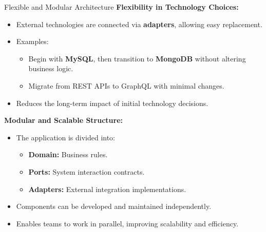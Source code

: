 \documentclass[aspectratio=169, table]{beamer}
\begin{document}
\begin{frame}[fragile]{Flexible and Modular Architecture}
	\vspace{20pt}
	\textbf{Flexibility in Technology Choices:}
	\begin{itemize}
		\item External technologies are connected via \textbf{adapters}, allowing easy replacement.
		\item Examples:  
		\begin{itemize}
			\item Begin with \textbf{MySQL}, then transition to \textbf{MongoDB} without altering business logic.
			\item Migrate from REST APIs to GraphQL with minimal changes.
		\end{itemize}
		\item Reduces the long-term impact of initial technology decisions.
	\end{itemize}
	
	\textbf{Modular and Scalable Structure:}
	\begin{itemize}
		\item The application is divided into:
		\begin{itemize}
			\item \textbf{Domain:} Business rules.
			\item \textbf{Ports:} System interaction contracts.
			\item \textbf{Adapters:} External integration implementations.
		\end{itemize}
		\item Components can be developed and maintained independently.
		\item Enables teams to work in parallel, improving scalability and efficiency.
	\end{itemize}
\end{frame}
\end{document}
